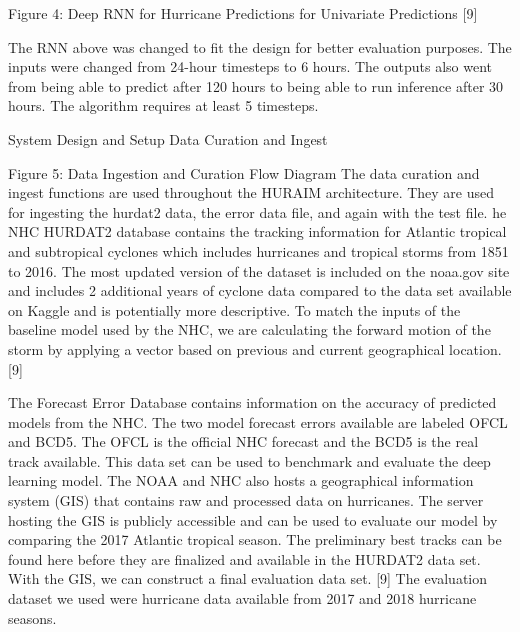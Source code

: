 \documentclass{article}
\begin{document}
Figure 4: Deep RNN for Hurricane Predictions for Univariate Predictions [9] %

The RNN above was changed to fit the design for better evaluation purposes. The inputs were changed from 24-hour timesteps to 6 hours. The outputs also went from being able to predict after 120 hours to being able to run inference after 30 hours. The algorithm requires at least 5 timesteps. 

System Design and Setup
Data Curation and Ingest


Figure 5: Data Ingestion and Curation Flow Diagram
The data curation and ingest functions are used throughout the HURAIM architecture. They are used for ingesting the hurdat2 data, the error data file, and again with the test file. he NHC HURDAT2 database contains the tracking information for Atlantic tropical and subtropical cyclones which includes hurricanes and tropical storms from 1851 to 2016. The most updated version of the dataset is included on the noaa.gov site and includes 2 additional years of cyclone data compared to the data set available on Kaggle and is potentially more descriptive. To match the inputs of the baseline model used by the NHC, we are calculating the forward motion of the storm by applying a vector based on previous and current geographical location.  [9]

The Forecast Error Database contains information on the accuracy of predicted models from the NHC. The two model forecast errors available are labeled OFCL and BCD5. The OFCL is the official NHC forecast and the BCD5 is the real track available. This data set can be used to benchmark and evaluate the deep learning model. The NOAA and NHC also hosts a geographical information system (GIS) that contains raw and processed data on hurricanes. The server hosting the GIS is publicly accessible and can be used to evaluate our model by comparing the 2017 Atlantic tropical season. The preliminary best tracks can be found here before they are finalized and available in the HURDAT2 data set. With the GIS, we can construct a final evaluation data set. [9] The evaluation dataset we used were hurricane data available from 2017 and 2018 hurricane seasons. 
\end{document}
